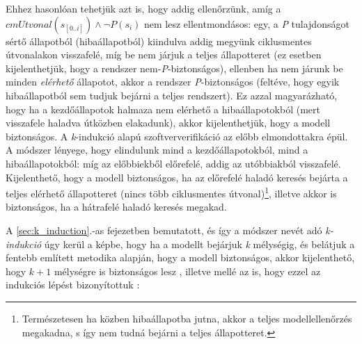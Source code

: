 Ehhez hasonlóan tehetjük azt is, hogy addig ellenőrzünk, amíg a $cmUtvonal(s_{[0..i]}) \wedge \neg P(s_{i})$ nem lesz ellentmondásos: egy, a \emph{P} tulajdonságot sértő állapotból (hibaállapotból) kiindulva addig megyünk ciklusmentes útvonalakon visszafelé, míg be nem járjuk a teljes állapotteret (ez esetben kijelenthetjük, hogy a rendszer nem-\emph{P}-biztonságos), ellenben ha nem járunk be minden \emph{elérhető} állapotot, akkor a rendszer \emph{P}-biztonságos (feltéve, hogy egyik hibaállapotból sem tudjuk bejárni a teljes rendszert). Ez azzal magyarázható, hogy ha a kezdőállapotok halmaza nem elérhető a hibaállapotokból (mert visszafele haladva útközben elakadunk), akkor kijelenthetjük, hogy a modell biztonságos.
\newline
\newline
A \emph{k}-indukció alapú szoftververifikáció az előbb elmondottakra épül. A módszer lényege, hogy elindulunk mind a kezdőállapotokból, mind a hibaállapotokból: míg az előbbiekből előrefelé, addig az utóbbiakból visszafelé. Kijelenthető, hogy a modell biztonságos, ha az előrefelé haladó keresés bejárta a teljes elérhető állapotteret (nincs több ciklusmentes útvonal)\footnote{Természetesen ha közben hibaállapotba jutna, akkor a teljes modellellenőrzés megakadna, s így nem tudná bejárni a teljes állapotteret.}, illetve akkor is biztonságos, ha a hátrafelé haladó keresés megakad.

A \ref{sec:k_induction}.-as fejezetben bemutatott, és így a módszer nevét adó \emph{k-indukció} úgy kerül a képbe, hogy ha a modellt bejárjuk \emph{k} mélységig, és belátjuk a fentebb említett metodika alapján, hogy a modell biztonságos, akkor kijelenthető, hogy $k+1$ mélységre is biztonságos lesz \cite{donaldson_cikk}, illetve mellé az is, hogy ezzel az indukciós lépést bizonyítottuk \cite{k_induction_article}:

\begin{comment}
\begin{algorithm}[H]
\SetAlgoLined
\KwResult{}
i=0\\
\While{True}{
instructions\\
\eIf{condition}{
instructions1\\
instructions2\\
}{
instructions3\\
}
}
\caption{Checking if model is \emph{P}-safe}
\end{algorithm}í
\end{comment}